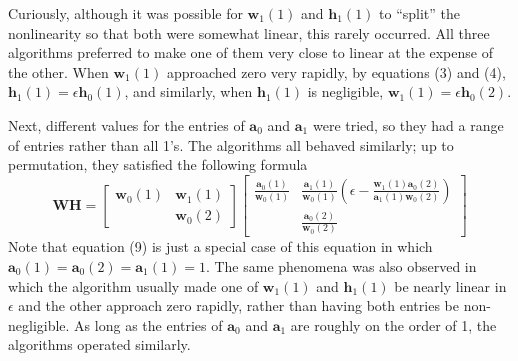 \documentclass[conference]{IEEEtran}
\begin{document}
Curiously, although it was possible for $ \mathbf{w}_1(1) $ and $ \mathbf{h}_1(1) $ to ``split'' the nonlinearity so that both were somewhat linear, this rarely occurred.  All three algorithms preferred to make one of them very close to linear at the expense of the other.  When $ \mathbf{w}_1(1) $ approached zero very rapidly, by equations (3) and (4), $ \mathbf{h}_1(1) = \epsilon \mathbf{h}_0(1) $, and similarly, when $ \mathbf{h}_1(1) $ is negligible, $ \mathbf{w}_1(1) = \epsilon \mathbf{h}_0(2) $.

Next, different values for the entries of $ \mathbf{a}_0 $ and $ \mathbf{a}_1 $ were tried, so they had a range of entries rather than all 1's. The algorithms all behaved similarly; up to permutation, they satisfied the following formula
\begin{equation}
\mathbf{WH} = \left[ \begin{array}{cc} \mathbf{w}_0(1) & \mathbf{w}_1(1) \\ & \mathbf{w}_0(2) \end{array} \right] \left[ \begin{array}{cc} \frac{\mathbf{a}_0(1)}{\mathbf{w}_0(1)} & \frac{\mathbf{a}_1(1)}{\mathbf{w}_0(1)}(\epsilon - \frac{\mathbf{w}_1(1)\mathbf{a}_0(2)}{\mathbf{a}_1(1)\mathbf{w}_0(2)}) \\ & \frac{\mathbf{a}_0(2)}{\mathbf{w}_0(2)} \end{array} \right]
\end{equation}
Note that equation (9) is just a special case of this equation in which $ \mathbf{a}_0(1) = \mathbf{a}_0(2) = \mathbf{a}_1(1) = 1 $.   The same phenomena was also observed in which the algorithm usually made one of $ \mathbf{w}_1(1) $ and $ \mathbf{h}_1(1) $ be nearly linear in $ \epsilon $ and the other approach zero rapidly, rather than having both entries be non-negligible.  As long as the entries of $ \mathbf{a}_0 $ and $ \mathbf{a}_1 $ are roughly on the order of 1, the algorithms operated similarly.
\end{document}
